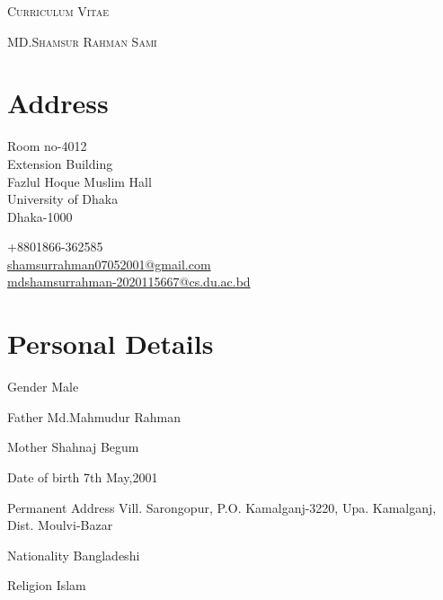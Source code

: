 \documentclass[a4paper]{article}
\begin{document}
\pagestyle{empty}

\begin{center}
\huge{\textsc{Curriculum Vitae}}
\vspace{\baselineskip}

{\Large\textsc{MD.Shamsur Rahman Sami}}\\
\end{center}
\vspace{1.5\baselineskip}

\section{Address}
\noindent
\begin{minipage}{.7\textwidth}
  Room no-4012\\
  Extension Building\\
  Fazlul Hoque Muslim Hall\\
  University of Dhaka\\
  Dhaka-1000\\
\end{minipage}
\begin{minipage}{.7\textwidth}
  \faPhone{} +8801866-362585\\
  \faEnvelopeO{}  \href{mailto:shamsurrahman07052001@gmail.com}{shamsurrahman07052001@gmail.com}\\
  \faEnvelopeO{}  \href{mailto:mdshamsurrahman-2020115667@cs.du.ac.bd}{mdshamsurrahman-2020115667@cs.du.ac.bd}\\
\end{minipage}

\section{Personal Details}
\begin{CV}
  \item[Gender] Male 
  \item[Father] Md.Mahmudur Rahman
  \item[Mother] Shahnaj Begum
  \item[Date of birth] 7th May,2001
  \item[Permanent Address] Vill. Sarongopur, P.O. Kamalganj-3220, Upa. Kamalganj, Dist. Moulvi-Bazar
  \item[Nationality] Bangladeshi
  \item[Religion] Islam
  \end{CV}
\end{document}
